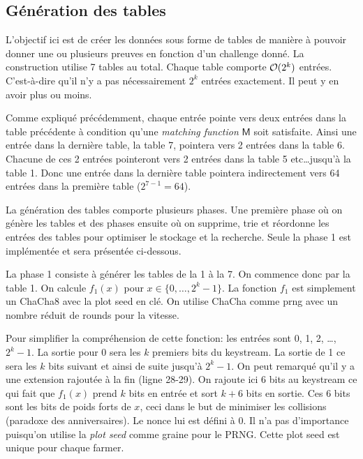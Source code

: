 \subsection{Génération des tables}

L'objectif ici est de créer les données sous forme de tables de manière à pouvoir donner une ou plusieurs preuves en fonction d'un challenge donné. La construction utilise 7 tables au total. Chaque table comporte $\mathcal{O}(2^k)$ entrées. C'est-à-dire qu'il n'y a pas nécessairement $2^k$ entrées exactement. Il peut y en avoir plus ou moins.

Comme expliqué précédemment, chaque entrée pointe vers deux entrées dans la table précédente à condition qu'une \emph{matching function} $\mathsf{M}$ soit satisfaite. Ainsi une entrée dans la dernière table, la table 7, pointera vers 2 entrées dans la table 6. Chacune de ces 2 entrées pointeront vers 2 entrées dans la table 5 etc\dots jusqu'à la table 1. Donc une entrée dans la dernière table pointera indirectement vers 64 entrées dans la première table ($2^{7-1} = 64$).

La génération des tables comporte plusieurs phases. Une première phase où on génère les tables et des phases ensuite où on supprime, trie et réordonne les entrées des tables pour optimiser le stockage et la recherche. Seule la phase 1 est implémentée et sera présentée ci-dessous.

La phase 1 consiste à générer les tables de la 1 à la 7. On commence donc par la table 1. On calcule $f_1(x)$ pour $x \in \{0,\dots,2^k-1\}$. La fonction $f_1$ est simplement un ChaCha8 avec la plot seed en clé. On utilise ChaCha comme \acrshort{prng} avec un nombre réduit de rounds pour la vitesse.


Pour simplifier la compréhension de cette fonction: les entrées sont 0, 1, 2, \dots, $2^k-1$. La sortie pour 0 sera les $k$ premiers bits du keystream. La sortie de 1 ce sera les $k$ bits suivant et ainsi de suite jusqu'à $2^k-1$. On peut remarqué qu'il y a une extension rajoutée à la fin (ligne 28-29). On rajoute ici 6 bits au keystream ce qui fait que $f_1(x)$ prend $k$ bits en entrée et sort $k+6$ bits en sortie. Ces 6 bits sont les bits de poids forts de $x$, ceci dans le but de minimiser les collisions (paradoxe des anniversaires). Le nonce lui est défini à 0. Il n'a pas d'importance puisqu'on utilise la \emph{plot seed} comme graine pour le PRNG. Cette plot seed est unique pour chaque farmer.

